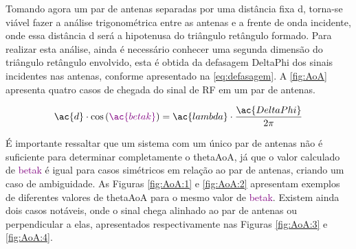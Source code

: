 
Tomando agora um par de antenas separadas por uma distância fixa \ac{d}, torna-se viável fazer a análise trigonométrica entre as antenas e a frente de onda incidente, onde essa distância \ac{d} será a hipotenusa do triângulo retângulo formado.
Para realizar esta análise, ainda é necessário conhecer uma segunda dimensão do triângulo retângulo envolvido, esta é obtida da defasagem \ac{DeltaPhi} dos sinais incidentes nas antenas, conforme apresentado na \autoref{eq:defasagem}.
A \autoref{fig:AoA} apresenta quatro casos de chegada do sinal de \ac{RF} em um par de antenas.


\begin{equation} \label{eq:defasagem}
    \ac{d} \cdot
    \cos\left(\textcolor{Purple}{\ac{betak}}\right) =
    \ac{lambda} \cdot
    \frac{\ac{DeltaPhi}}{2 \pi}
\end{equation}


É importante ressaltar que um sistema com um único par de antenas não é suficiente para determinar completamente o \ac{thetaAoA}, já que o valor calculado de \textcolor{Purple}{\ac{betak}} é igual para casos simétricos em relação ao par de antenas, criando um caso de ambiguidade.
As Figuras \ref{fig:AoA:1} e \ref{fig:AoA:2} apresentam exemplos de diferentes valores de \ac{thetaAoA} para o mesmo valor de \textcolor{Purple}{\ac{betak}}.
Existem ainda dois casos notáveis, onde o sinal chega alinhado ao par de antenas ou perpendicular a elas, apresentados respectivamente nas Figuras \ref{fig:AoA:3} e \ref{fig:AoA:4}.

